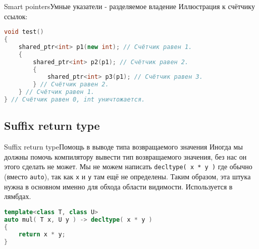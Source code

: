 \documentclass[10pt]{beamer}
\begin{document}
\begin{frame}[fragile]{Smart pointers}{Умные указатели - разделяемое владение}
Иллюстрация к счётчику ссылок:
\begin{lstlisting}[language=C++]
void test()
{
    shared_ptr<int> p1(new int); // Счётчик равен 1.
    {
        shared_ptr<int> p2(p1); // Счётчик равен 2.
        {
            shared_ptr<int> p3(p1); // Счётчик равен 3.
        } // Счётчик равен 2.
    } // Счётчик равен 1.
} // Счётчик равен 0, int уничтожается.

\end{lstlisting}
\end{frame}

\subsection{Suffix return type}
\hypertarget{Suffix return type}{}
\begin{frame}[fragile]{Suffix return type}{Помощь в выводе типа возвращаемого значения}
Иногда мы должны помочь компилятору вывести тип возвращаемого значения, без нас он этого сделать не может. Мы не можем написать \texttt{decltype( x * y )} где обычно (вместо \texttt{auto}), так как \texttt{x} и \texttt{y} там ещё не определены. Таким образом, эта штука нужна в основном именно для обхода области видимости. Используется в лямбдах.
\begin{lstlisting}[language=C++]
template<class T, class U>
auto mul( T x, U y ) -> decltype( x * y )
{
    return x * y;
}
\end{lstlisting}
\end{frame}
\end{document}
